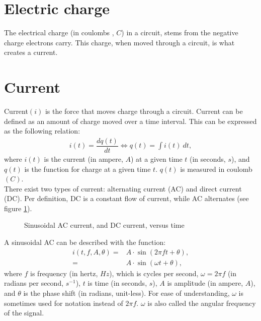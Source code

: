 \section{Electric charge}
The electrical charge (in coulombs , $C$) in a circuit, stems from the negative charge electrons carry. This charge, when moved through a circuit, is what creates a current.   
\section{Current}
Current$(i)$ is the force that moves charge through a circuit. Current can be defined as an amount of charge moved over a time interval. This can be expressed as the following relation: \cite[p.~3]{bcircuit5}
\begin{align}
i(t)=\dfrac{dq(t)}{dt} \Leftrightarrow q(t)=\int i(t)\ dt,\label{I=dq/dt}
\end{align}
where $i(t)$ is the current (in ampere, $A$) at a given time $t$ (in seconds, $s$), and $q(t)$ is the function for charge at a given time $t$. $q(t)$ is measured in coulomb $(C)$.
\\
There exist two types of current: alternating current (AC) and direct current (DC). Per definition, DC is a constant flow of current, while AC alternates (see figure \ref{fig:ACDC}). 
\begin{figure}[H] 

\caption{Sinusoidal AC current, and DC current, versus time}
\label{fig:ACDC}
\end{figure}
\noindent
A sinusoidal AC can be described with the function: 
\begin{align}
i\left(t, f, A, \theta\right) =& A\cdot \sin{\left(2\pi ft + \theta\right)}, \nonumber
\\
=& A \cdot \sin{\left(\omega t + \theta\right)}, \label{eq:omega}
\end{align}
where $f$ is frequency (in hertz, $Hz$), which is cycles per second, $\omega = 2\pi f$ (in radians per second, $s^{-1}$), $t$ is time (in seconds, $s$), $A$ is amplitude (in ampere, $A$), and $\theta$ is the phase shift (in radians, unit-less).
For ease of understanding, $\omega$ is sometimes used for notation instead of $2\pi f$. $\omega$ is also called the angular frequency of the signal.
